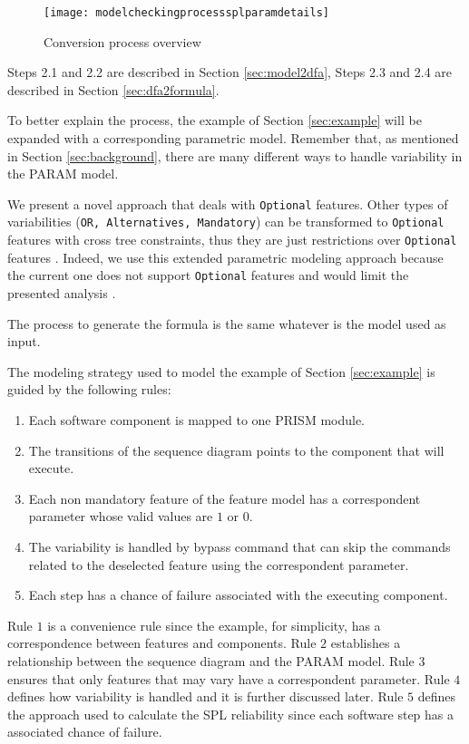 \documentclass[conference]{IEEEtran}
\begin{document}
	\begin{figure}[!h]
	\centering
	\texttt{[image: modelcheckingprocesssplparamdetails]}	
	\caption{Conversion process overview}
	\label{fig:proc}
	\end{figure}
	
	Steps 2.1 and 2.2 are described in Section \ref{sec:model2dfa}, 
	Steps 2.3 and 2.4 are described in Section \ref{sec:dfa2formula}.

	To better explain the process, the example of Section \ref{sec:example} will be
	expanded with a corresponding parametric model. 
	Remember that, as mentioned in Section \ref{sec:background},
	there are many different ways to handle variability in the PARAM model.
	
	We present a novel approach that deals with \texttt{Optional}
	features. Other types of variabilities (\texttt{OR, Alternatives, Mandatory})
	can be transformed to \texttt{Optional} features with cross tree constraints,
	thus they are just restrictions over \texttt{Optional} features \cite{rohit}.	
	Indeed, we use this extended parametric modeling approach because the current one
	does not support \texttt{Optional} features and would limit the presented analysis \cite{GhezziSPLC}.
		
	The process to generate the 
	formula is the same whatever is the model used as input. 
				
	The modeling strategy used to model the example of Section \ref{sec:example} 
	is guided by the following rules:
	
	\begin{enumerate}
		\item Each software component is mapped to one PRISM module.
		\item The transitions of the sequence diagram points to the component that will execute.
		\item Each non mandatory feature of the feature model has a correspondent 
		parameter whose valid values are $1$ or $0$.
		\item The variability is handled by bypass command that can skip
		the commands related to the deselected feature using the correspondent
		parameter.
		\item Each step has a chance of failure associated with the executing component.
	\end{enumerate}
	
	Rule $1$ is a convenience rule since the example, for simplicity, has
	a correspondence between features and components. Rule $2$ establishes
	a relationship between the sequence diagram and the PARAM model. Rule $3$ 
	ensures that only features that may vary have a correspondent parameter. Rule $4$
	 defines how variability is handled and it is further discussed later. Rule $5$
	 defines the approach used to calculate the SPL reliability since each
	 software step has a associated chance of failure.
	 
\end{document}
